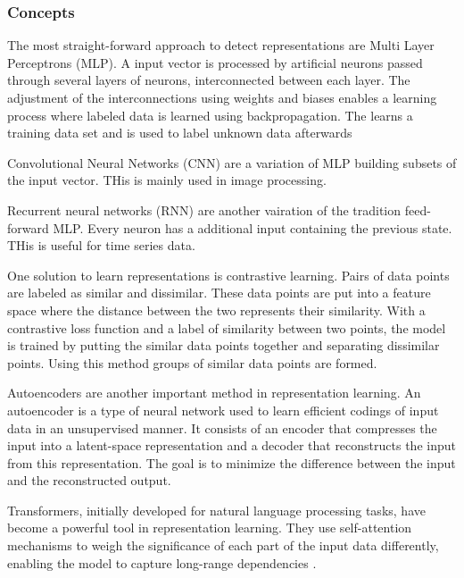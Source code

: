\subsubsection{Concepts}
The most straight-forward approach to detect representations are Multi Layer Perceptrons (MLP). A input vector is processed by artificial neurons passed through several layers of neurons, interconnected between each layer. The adjustment of the interconnections using weights and biases enables a learning process where labeled data is learned using backpropagation. The learns a training data set and is used to label unknown data afterwards \cite{nielsen_neural_2015}

Convolutional Neural Networks (CNN) are a variation of MLP building subsets of the input vector. THis is mainly used in image processing.

Recurrent neural networks (RNN) are another vairation of the tradition feed-forward MLP. Every neuron has a additional input containing the previous state. THis is useful for time series data.

One solution to learn representations is contrastive learning. Pairs of data points are labeled as similar and dissimilar. These data points are put into a feature space where the distance between the two represents their similarity. With a contrastive loss function and a label of similarity between two points, the model is trained by putting the similar data points together and separating dissimilar points. Using this method groups of similar data points are formed.

Autoencoders are another important method in representation learning. An autoencoder is a type of neural network used to learn efficient codings of input data in an unsupervised manner. It consists of an encoder that compresses the input into a latent-space representation and a decoder that reconstructs the input from this representation. The goal is to minimize the difference between the input and the reconstructed output.


Transformers, initially developed for natural language processing tasks, have become a powerful tool in representation learning. They use self-attention mechanisms to weigh the significance of each part of the input data differently, enabling the model to capture long-range dependencies \cite{vaswani_attention_2017}.

